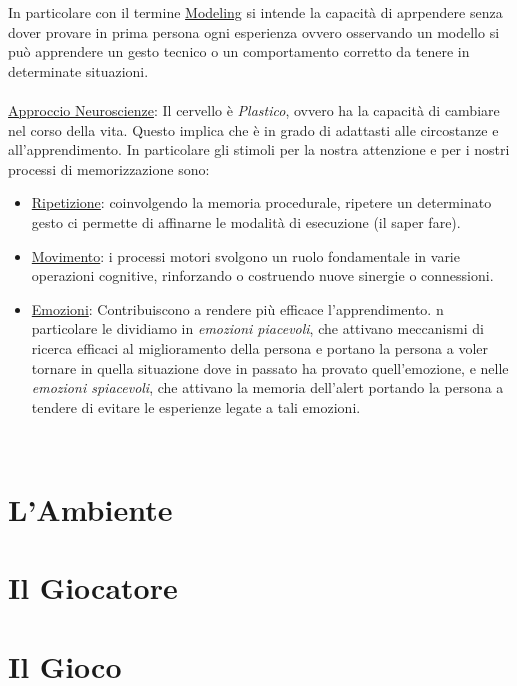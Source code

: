 \documentclass[../uefaC.tex]{subfiles}
\begin{document}
In particolare con il termine \underline{Modeling} si intende la capacità di aprpendere senza dover provare in prima persona ogni esperienza ovvero osservando un modello si può apprendere un gesto tecnico o un comportamento corretto da tenere in determinate situazioni. \hfill \\ 
\hfill \\ 
\underline{Approccio Neuroscienze}: Il cervello è \emph{Plastico}, ovvero ha la capacità di cambiare nel corso della vita. Questo implica che è in grado di adattasti alle circostanze e all'apprendimento. In particolare gli stimoli per la nostra attenzione e per i nostri processi di memorizzazione sono:
\begin{itemize}
    \item \underline{Ripetizione}: coinvolgendo la memoria procedurale, ripetere un determinato gesto ci permette di affinarne le modalità di esecuzione (il saper fare).
    \item \underline{Movimento}: i processi motori svolgono un ruolo fondamentale in varie operazioni cognitive, rinforzando o costruendo nuove sinergie o connessioni.
    \item \underline{Emozioni}: Contribuiscono a rendere più efficace l'apprendimento. n particolare le dividiamo in \emph{emozioni piacevoli}, che attivano meccanismi di ricerca efficaci al miglioramento della persona e portano la persona a voler tornare in quella situazione dove in passato ha provato quell'emozione, e nelle \emph{emozioni spiacevoli}, che attivano la memoria dell'alert portando la persona a tendere di evitare le esperienze legate a tali emozioni.
\end{itemize}
\hfill \\ 


\section{L'Ambiente}

\section{Il Giocatore}

\section{Il Gioco}
\end{document}
